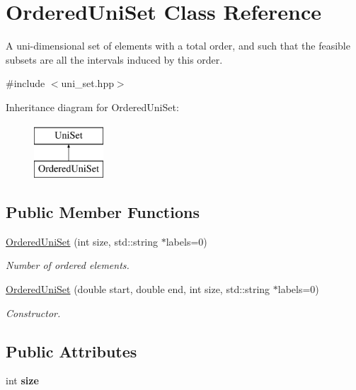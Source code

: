 \hypertarget{classOrderedUniSet}{\section{Ordered\-Uni\-Set Class Reference}
\label{classOrderedUniSet}
}


A uni-\/dimensional set of elements with a total order, and such that the feasible subsets are all the intervals induced by this order.  




{\ttfamily \#include $<$uni\-\_\-set.\-hpp$>$}

Inheritance diagram for Ordered\-Uni\-Set\-:\begin{figure}[H]
\begin{center}
\leavevmode
\includegraphics[height=2.000000cm]{classOrderedUniSet}
\end{center}
\end{figure}
\subsection*{Public Member Functions}
\begin{DoxyCompactItemize}
\item 
\hyperlink{classOrderedUniSet_a4e0316100e220b62d93adc015edd3dc4}{Ordered\-Uni\-Set} (int size, std\-::string $\ast$labels=0)
\begin{DoxyCompactList}\small\item\em Number of ordered elements. \end{DoxyCompactList}\item 
\hyperlink{classOrderedUniSet_a1d50d27d1ca26fa8c4aaebdc4d53c773}{Ordered\-Uni\-Set} (double start, double end, int size, std\-::string $\ast$labels=0)
\begin{DoxyCompactList}\small\item\em Constructor. \end{DoxyCompactList}\end{DoxyCompactItemize}
\subsection*{Public Attributes}
\begin{DoxyCompactItemize}
\item 
\hypertarget{classOrderedUniSet_ae0c3867ab74ade7469492b48742adb2a}{int {\bfseries size}}\label{classOrderedUniSet_ae0c3867ab74ade7469492b48742adb2a}

\end{DoxyCompactItemize}
